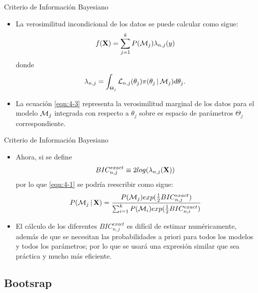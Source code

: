 \begin{frame}{Criterio de Información Bayesiano}
  \begin{itemize} 
    \itemsep1em
    \item 
    La verosimilitud incondicional de los datos se puede calcular como sigue: 
    \begin{equation}
    f(\textbf{X}) = \sum_{j=1}^k P(\mathcal{M}_j) \lambda_{n, j}(y)
    \label{eqn:4-2}
    \end{equation}
    donde 
    \begin{equation}
    \lambda_{n, j} = \int_{\Theta_j} \mathcal{L}_{n, j}(\theta_j) \pi(\theta_j \,|\, \mathcal{M}_j) d\theta_j.
    \label{eqn:4-3}
    \end{equation}

    \item
    La ecuación \eqref{eqn:4-3} representa la verosimilitud marginal de los datos para el modelo $\mathcal{M}_j$ integrada con respecto a $\theta_j$ sobre es espacio de parámetros $\Theta_j$ correspondiente.
  \end{itemize}
\end{frame}        


\begin{frame}{Criterio de Información Bayesiano}
  \begin{itemize} 
    \itemsep1em
    \item 
    Ahora, si se define 
    \begin{equation}
    BIC_{n, j}^{exact} \equiv 2 log(\lambda_{n, j}(\textbf{X}))
    \label{eqn:4-4}
    \end{equation}
    por lo que \eqref{eqn:4-1} se podría reescribir como sigue: 
    \begin{equation}
    P(\mathcal{M}_j \,|\, \textbf{X}) = \frac{ P(\mathcal{M}_j)  exp(\frac{1}{2} BIC_{n, j}^{exact}) }
    { \sum_{i=1}^k  P(\mathcal{M}_i) exp(\frac{1}{2} BIC_{n, i}^{exact}) }
    \label{eqn:4-5}
    \end{equation}

    \item 
    El cálculo de los diferentes $BIC_{n, j}^{exact}$ es difícil de estimar numéricamente, además de que se necesitan las probabilidades a priori para todos los modelos y todos los parámetros; por lo que se usará una expresión similar que sea práctica y mucho más eficiente.
  \end{itemize}
\end{frame}        


\subsection{Bootsrap}

